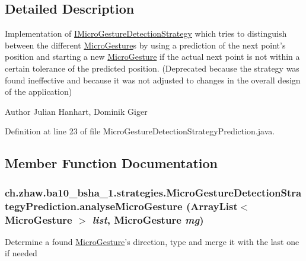 \subsection{Detailed Description}
Implementation of \hyperlink{interfacech_1_1zhaw_1_1ba10__bsha__1_1_1strategies_1_1IMicroGestureDetectionStrategy}{IMicroGestureDetectionStrategy} which tries to distinguish between the different \hyperlink{}{MicroGesture}s by using a prediction of the next point's position and starting a new \hyperlink{}{MicroGesture} if the actual next point is not within a certain tolerance of the predicted position. (Deprecated because the strategy was found ineffective and because it was not adjusted to changes in the overall design of the application)

\begin{DoxyAuthor}{Author}
Julian Hanhart, Dominik Giger 
\end{DoxyAuthor}


Definition at line 23 of file MicroGestureDetectionStrategyPrediction.java.

\subsection{Member Function Documentation}
\hypertarget{classch_1_1zhaw_1_1ba10__bsha__1_1_1strategies_1_1MicroGestureDetectionStrategyPrediction_a741f6f5dfadc6a6ad25f03088ff55fc9}{
\subsubsection[{analyseMicroGesture}]{ ch.zhaw.ba10\_\-bsha\_\-1.strategies.MicroGestureDetectionStrategyPrediction.analyseMicroGesture (ArrayList$<$ {\bf MicroGesture} $>$ {\em list}, \/  {\bf MicroGesture} {\em mg})}}
\label{classch_1_1zhaw_1_1ba10__bsha__1_1_1strategies_1_1MicroGestureDetectionStrategyPrediction_a741f6f5dfadc6a6ad25f03088ff55fc9}
Determine a found \hyperlink{}{MicroGesture}'s direction, type and merge it with the last one if needed


